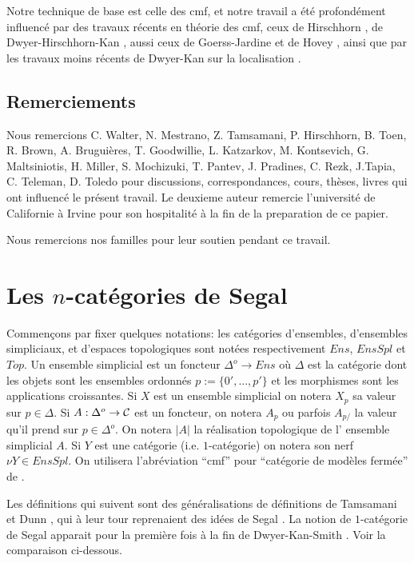 \documentclass[12pt]{article}
\newcommand{\numero}[1]{\newpage\section{#1}}
\newcommand{\subnumero}[1]{\subsection*{#1}\phantomsection\addcontentsline{toc}{subsection}{#1}}
\newcommand{\Cc}{{\cal C}}
\begin{document}
Notre technique de base est celle des cmf, et notre travail
a \'et\'e profond\'ement
influenc\'e par
des travaux r\'ecents en  th\'eorie des cmf, ceux de Hirschhorn
\cite{Hirschhorn}, de Dwyer-Hirschhorn-Kan \cite{DHK}, aussi ceux de
Goerss-Jardine \cite{JardineGoerssBook} et de Hovey \cite{HoveyMonMod}
\cite{HoveyBook}, ainsi que par les travaux moins r\'ecents de
Dwyer-Kan sur la
localisation \cite{DwyerKan1} \cite{DwyerKan2} \cite{DwyerKan3}
\cite{DwyerKanDiags}.






\subnumero{Remerciements}


Nous remercions C. Walter, N. Mestrano, Z. Tamsamani, P. Hirschhorn, B. Toen,
R. Brown, A. Brugui\`eres, T. Goodwillie, L. Katzarkov, M. Kontsevich,
G. Maltsiniotis,  H. Miller, S. Mochizuki,  T. Pantev, J. Pradines, C. Rezk,
J.Tapia, C. Teleman, D. Toledo
pour discussions, correspondances, cours,
th\`eses, livres qui ont
influenc\'e le pr\'esent travail. Le deuxieme auteur remercie l'universit\'e de
Californie \`a Irvine pour son hospitalit\'e \`a la fin de la preparation de ce
papier.

Nous remercions nos familles pour leur soutien pendant ce travail.


\numero{Les \texorpdfstring{$n$}{n}-cat\'egories de Segal}

\label{ncatsegpage}

Commen\c{c}ons par fixer quelques notations: les cat\'egories d'ensembles,
d'ensembles
simpliciaux, et d'espaces topologiques sont not\'ees respectivement
$Ens$, $EnsSpl$ et $Top$. Un ensemble simplicial est un foncteur
$\Delta ^o\rightarrow Ens$ o\`u $\Delta$ est la cat\'egorie dont les objets
sont les ensembles ordonn\'es $p:= \{ 0', \ldots , p'\}$ et les morphismes
sont les
applications croissantes. Si $X$ est un ensemble simplicial on notera
$X_p$ sa valeur sur $p\in \Delta$. Si $A: \Delta
^o\rightarrow \Cc$ est un foncteur, on notera $A_p$ ou parfois $A_{p/}$ la
valeur
qu'il prend sur $p\in \Delta ^o$.
On notera $|A|$ la r\'ealisation topologique de l'
ensemble simplicial $A$. Si $Y$ est une cat\'egorie (i.e. $1$-cat\'egorie) on
notera son nerf $\nu Y \in EnsSpl$. On utilisera l'abr\'eviation
``cmf'' pour ``cat\'egorie de mod\`eles ferm\'ee'' de \cite{Quillen}.

Les d\'efinitions qui suivent sont des g\'en\'eralisations de d\'efinitions de
Tamsamani \cite{Tamsamani} et Dunn \cite{Dunn}, qui \`a leur tour reprenaient
des id\'ees de Segal \cite{SegalTopology} \cite{Adams}. 
La notion de $1$-cat\'egorie de Segal apparait pour la premi\`ere fois
\`a la fin de Dwyer-Kan-Smith \cite{DKS}.
Voir la
comparaison ci-dessous.
\end{document}
